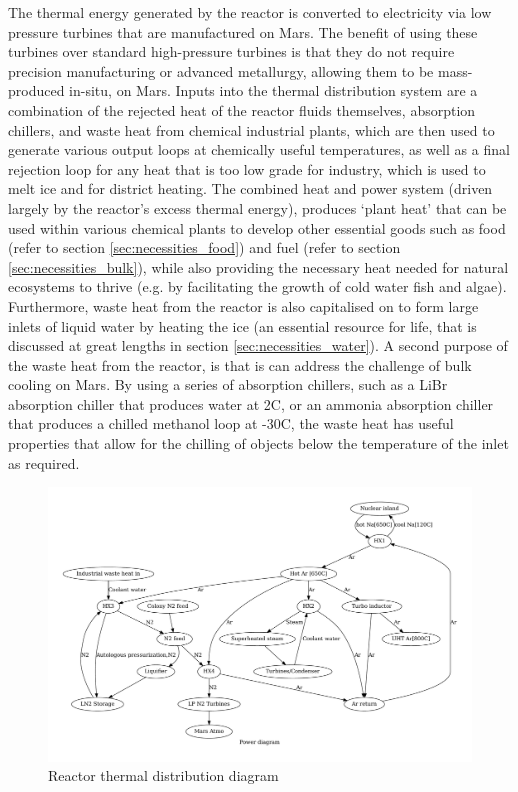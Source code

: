 \documentclass[fleqn,10pt]{Stylesheet} %
\begin{document}
The thermal energy generated by the reactor is converted to electricity via low pressure turbines that are manufactured on Mars. The benefit of using these turbines over standard high-pressure turbines is that they do not require precision manufacturing or advanced metallurgy, allowing them to be mass-produced in-situ, on Mars. Inputs into the thermal distribution system are a combination of the rejected heat of the reactor fluids themselves, absorption chillers, and waste heat from chemical industrial plants, which are then used to generate various output loops at chemically useful temperatures, as well as a final rejection loop for any heat that is too low grade for industry, which is used to melt ice and for district heating. The combined heat and power system (driven largely by the reactor’s excess thermal energy), produces ‘plant heat’ that can be used within various chemical plants to develop other essential goods such as food (refer to section \ref{sec:necessities_food}) and fuel (refer to section \ref{sec:necessities_bulk}), while also providing the necessary heat needed for natural ecosystems to thrive (e.g. by facilitating the growth of cold water fish and algae). Furthermore, waste heat from the reactor is also capitalised on to form large inlets of liquid water by heating the ice (an essential resource for life, that is discussed at great lengths in section \ref{sec:necessities_water}). A second purpose of the waste heat from the reactor, is that is can address the challenge of bulk cooling on Mars. By using a series of absorption chillers, such as a LiBr absorption chiller that produces water at 2\degree{}C, or an ammonia absorption chiller that produces a chilled methanol loop at -30\degree{}C, the waste heat has useful properties that allow for the chilling of objects below the temperature of the inlet as required.

\begin{figure}
    \centering
    \includegraphics[width=\linewidth]{figures/fig_power.pdf}
    \caption{Reactor thermal distribution diagram}
    \label{fig:power_diagram}
\end{figure}
\end{document}
